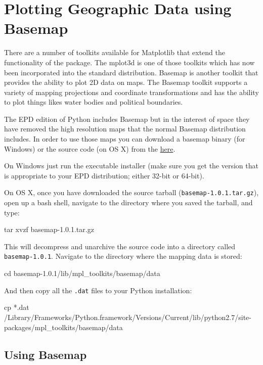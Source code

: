 \section{Plotting Geographic Data using Basemap}

There are a number of toolkits available for Matplotlib that extend the
functionality of the package. The mplot3d is one of those toolkits which
has now been incorporated into the standard distribution. Basemap is
another toolkit that provides the ability to plot 2D data on maps. The
Basemap toolkit supports a variety of mapping projections and coordinate
transformations and has the ability to plot things likes water bodies
and political boundaries.

The EPD edition of Python includes Basemap but in the interest of space
they have removed the high resolution maps that the normal Basemap
distribution includes. In order to use those maps you can download a
basemap binary (for Windows) or the source code (on OS X) from the
\href{http://sourceforge.net/projects/matplotlib/files/matplotlib-toolkits/basemap-1.0.1/}{here}.

On Windows just run the executable installer (make sure you get the
version that is appropriate to your EPD distribution; either 32-bit or
64-bit).

On OS X, once you have downloaded the source tarball
(\lstinline!basemap-1.0.1.tar.gz!), open up a bash shell, navigate to
the directory where you saved the tarball, and type:

\begin{python}[language=bash]
tar xvzf basemap-1.0.1.tar.gz
\end{python}
This will decompress and unarchive the source code into a directory
called \lstinline!basemap-1.0.1!. Navigate to the directory where the
mapping data is stored:

\begin{python}[language=bash]
cd basemap-1.0.1/lib/mpl_toolkits/basemap/data
\end{python}
And then copy all the \lstinline!.dat! files to your Python
installation:

\begin{python}[language=bash]
cp *.dat /Library/Frameworks/Python.framework/Versions/Current/lib/python2.7/site-packages/mpl_toolkits/basemap/data
\end{python}
\subsection{Using Basemap}

